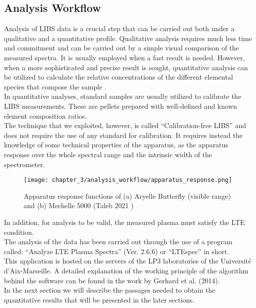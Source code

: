 \subsection{Analysis Workflow}
\label{subsec:analysis_workflow}
Analysis of LIBS data is a crucial step that can be carried out both under a qualitative and a quantitative profile. Qualitative analysis requires much less time and commitment and can be carried out by a simple visual comparison of the measured spectra. It is usually employed when a fast result is needed. However, when a more sophisticated and precise result is sought, quantitative analysis can be utilized to calculate the relative concentrations of the different elemental species that compose the sample \cite{anabitarteLaserInducedBreakdownSpectroscopy2012}.
\\
In quantitative analyses, standard samples are usually utilized to calibrate the LIBS measurements. These are pellets prepared with well-defined and known element composition ratios.
\\
The technique that we exploited, however, is called “Calibration-free LIBS” and does not require the use of any standard for calibration. It requires instead the knowledge of some technical properties of the apparatus, as the apparatus response over the whole spectral range and the intrinsic width of the spectrometer.
\begin{figure}[H]
    \centering
    \texttt{[image: chapter\_3/analysis\_workflow/apparatus\_response.png]} 
    \caption{Apparatus response functions of (a) Aryelle Butterfly (visible range) and (b) Mechelle 5000 (Taleb 2021 \cite{talebEchelleSpectrometerCalibration2021})}
    \label{fig:apparatus_response}
\end{figure}
In addition, for analysis to be valid, the measured plasma must satisfy the LTE condition.
\\
The analysis of the data has been carried out through the use of a program called: “Analyze LTE Plasma Spectra” (Ver. 2.6.6) or “LTEspec” in short.
\\
This application is hosted on the servers of the LP3 laboratories of the Université d'Aix-Marseille. A detailed explanation of the working principle of the algorithm behind the software can be found in the work by Gerhard et al. (2014)\cite{gerhardQuantitativeAnalysesGlass2014}.
\\
In the next section we will describe the passages needed to obtain the quantitative results that will be presented in the later sections.
